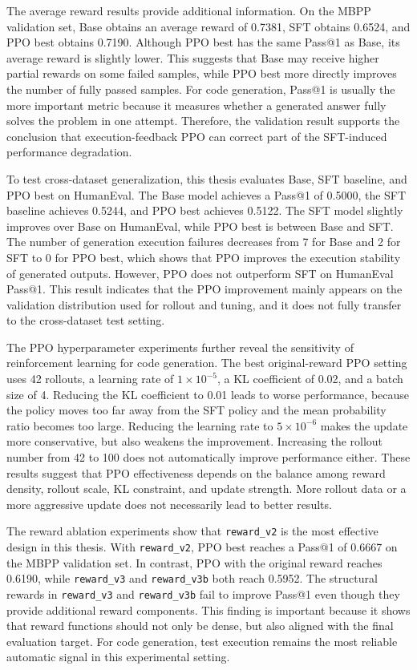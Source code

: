 \begin{digest}
The average reward results provide additional information. On the MBPP validation set, Base obtains an average reward of 0.7381, SFT obtains 0.6524, and PPO best obtains 0.7190. Although PPO best has the same Pass@1 as Base, its average reward is slightly lower. This suggests that Base may receive higher partial rewards on some failed samples, while PPO best more directly improves the number of fully passed samples. For code generation, Pass@1 is usually the more important metric because it measures whether a generated answer fully solves the problem in one attempt. Therefore, the validation result supports the conclusion that execution-feedback PPO can correct part of the SFT-induced performance degradation.

To test cross-dataset generalization, this thesis evaluates Base, SFT baseline, and PPO best on HumanEval. The Base model achieves a Pass@1 of 0.5000, the SFT baseline achieves 0.5244, and PPO best achieves 0.5122. The SFT model slightly improves over Base on HumanEval, while PPO best is between Base and SFT. The number of generation execution failures decreases from 7 for Base and 2 for SFT to 0 for PPO best, which shows that PPO improves the execution stability of generated outputs. However, PPO does not outperform SFT on HumanEval Pass@1. This result indicates that the PPO improvement mainly appears on the validation distribution used for rollout and tuning, and it does not fully transfer to the cross-dataset test setting.

The PPO hyperparameter experiments further reveal the sensitivity of reinforcement learning for code generation. The best original-reward PPO setting uses 42 rollouts, a learning rate of $1\times10^{-5}$, a KL coefficient of 0.02, and a batch size of 4. Reducing the KL coefficient to 0.01 leads to worse performance, because the policy moves too far away from the SFT policy and the mean probability ratio becomes too large. Reducing the learning rate to $5\times10^{-6}$ makes the update more conservative, but also weakens the improvement. Increasing the rollout number from 42 to 100 does not automatically improve performance either. These results suggest that PPO effectiveness depends on the balance among reward density, rollout scale, KL constraint, and update strength. More rollout data or a more aggressive update does not necessarily lead to better results.

The reward ablation experiments show that \texttt{reward\_v2} is the most effective design in this thesis. With \texttt{reward\_v2}, PPO best reaches a Pass@1 of 0.6667 on the MBPP validation set. In contrast, PPO with the original reward reaches 0.6190, while \texttt{reward\_v3} and \texttt{reward\_v3b} both reach 0.5952. The structural rewards in \texttt{reward\_v3} and \texttt{reward\_v3b} fail to improve Pass@1 even though they provide additional reward components. This finding is important because it shows that reward functions should not only be dense, but also aligned with the final evaluation target. For code generation, test execution remains the most reliable automatic signal in this experimental setting.


\end{digest}
